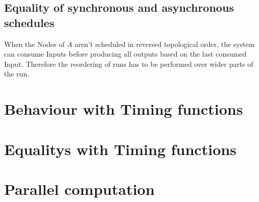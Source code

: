 



\subsection{Equality of synchronous and asynchronous schedules}
\label{sec:concepts:equalitys_without_timing:sync_async}

When the Nodes of \(A\) aren't scheduled in reversed topological order, the system can consume Inputs before producing all outputs based on the last consumed Input.
Therefore the reordering of runs has to be performed over wider parts of the run.

\section{Behaviour with Timing functions}
\section{Equalitys with Timing functions}
\section{Parallel computation}
